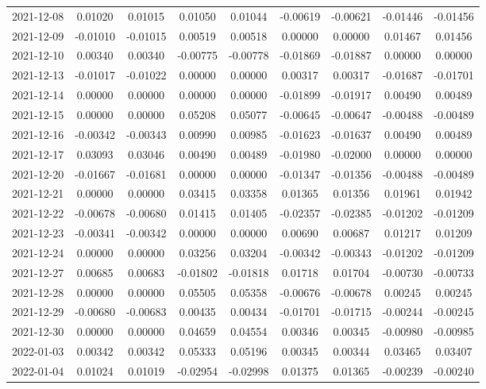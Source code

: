 {\begin{footnotesize}
\begin{longtable}{lcccccccc}
2021-12-08 & 0.01020 & 0.01015 & 0.01050 & 0.01044 & -0.00619 & -0.00621 & -0.01446 & -0.01456 \\
2021-12-09 & -0.01010 & -0.01015 & 0.00519 & 0.00518 & 0.00000 & 0.00000 & 0.01467 & 0.01456 \\
2021-12-10 & 0.00340 & 0.00340 & -0.00775 & -0.00778 & -0.01869 & -0.01887 & 0.00000 & 0.00000 \\
2021-12-13 & -0.01017 & -0.01022 & 0.00000 & 0.00000 & 0.00317 & 0.00317 & -0.01687 & -0.01701 \\
2021-12-14 & 0.00000 & 0.00000 & 0.00000 & 0.00000 & -0.01899 & -0.01917 & 0.00490 & 0.00489 \\
2021-12-15 & 0.00000 & 0.00000 & 0.05208 & 0.05077 & -0.00645 & -0.00647 & -0.00488 & -0.00489 \\
2021-12-16 & -0.00342 & -0.00343 & 0.00990 & 0.00985 & -0.01623 & -0.01637 & 0.00490 & 0.00489 \\
2021-12-17 & 0.03093 & 0.03046 & 0.00490 & 0.00489 & -0.01980 & -0.02000 & 0.00000 & 0.00000 \\
2021-12-20 & -0.01667 & -0.01681 & 0.00000 & 0.00000 & -0.01347 & -0.01356 & -0.00488 & -0.00489 \\
2021-12-21 & 0.00000 & 0.00000 & 0.03415 & 0.03358 & 0.01365 & 0.01356 & 0.01961 & 0.01942 \\
2021-12-22 & -0.00678 & -0.00680 & 0.01415 & 0.01405 & -0.02357 & -0.02385 & -0.01202 & -0.01209 \\
2021-12-23 & -0.00341 & -0.00342 & 0.00000 & 0.00000 & 0.00690 & 0.00687 & 0.01217 & 0.01209 \\
2021-12-24 & 0.00000 & 0.00000 & 0.03256 & 0.03204 & -0.00342 & -0.00343 & -0.01202 & -0.01209 \\
2021-12-27 & 0.00685 & 0.00683 & -0.01802 & -0.01818 & 0.01718 & 0.01704 & -0.00730 & -0.00733 \\
2021-12-28 & 0.00000 & 0.00000 & 0.05505 & 0.05358 & -0.00676 & -0.00678 & 0.00245 & 0.00245 \\
2021-12-29 & -0.00680 & -0.00683 & 0.00435 & 0.00434 & -0.01701 & -0.01715 & -0.00244 & -0.00245 \\
2021-12-30 & 0.00000 & 0.00000 & 0.04659 & 0.04554 & 0.00346 & 0.00345 & -0.00980 & -0.00985 \\
2022-01-03 & 0.00342 & 0.00342 & 0.05333 & 0.05196 & 0.00345 & 0.00344 & 0.03465 & 0.03407 \\
2022-01-04 & 0.01024 & 0.01019 & -0.02954 & -0.02998 & 0.01375 & 0.01365 & -0.00239 & -0.00240 \\

\end{longtable}
\end{footnotesize}}
